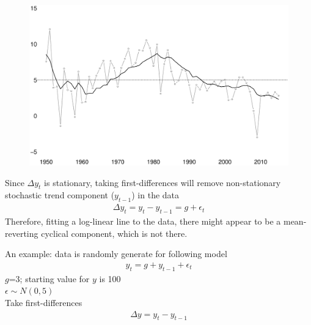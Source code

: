 \documentclass{beamer}
\begin{document}
\begin{frame}
  \begin{figure}
    \includegraphics[scale=.3]{us_gdp_g.eps}
  \end{figure}
\end{frame}


\begin{frame}
  Since $\Delta y_t$ is stationary, taking first-differences will remove non-stationary stochastic trend component ($y_{t-1}$) in the data
  \begin{align}
    \Delta y_t= y_t - y_{t-1}=g+\epsilon_t
  \end{align}
  \medskip
  Therefore, fitting a log-linear line to the data, there might appear to be a mean-reverting cyclical component, which is not there.  
\end{frame}


\begin{frame}
  An example: data is randomly generate for following model
  \begin{align}
    y_t=g+y_{t-1}+\epsilon_t
  \end{align}
  \medskip
  $g$=3; starting value for $y$ is 100\\
  $\epsilon \sim N(0,5)$\\
  Take first-differences
  \begin{align}
    \Delta y = y_t - y_{t-1}
  \end{align}
\end{frame}
\end{document}
